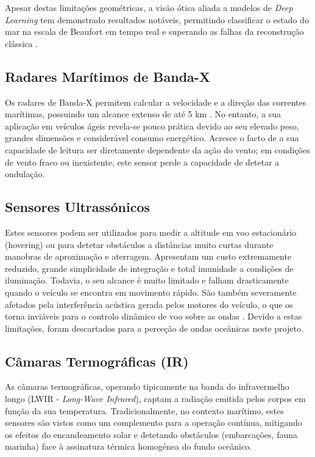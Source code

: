 \documentclass[11pt,a4paper]{article}
\begin{document}
Apesar destas limitações geométricas, a visão ótica aliada a modelos de \emph{Deep Learning} tem demonstrado resultados notáveis, permitindo classificar o estado do mar na escala de Beaufort em tempo real e superando as falhas da reconstrução clássica \parencite{11320450}.

\subsection{Radares Marítimos de Banda-X}
Os radares de Banda-X permitem calcular a velocidade e a 
direção das correntes marítimas, possuindo um alcance 
extenso de até 5 km \parencite{rs9121261}. No entanto, 
a sua aplicação em veículos ágeis revela-se pouco prática 
devido ao seu elevado peso, grandes dimensões e considerável 
consumo energético. Acresce o facto de a sua capacidade de 
leitura ser diretamente dependente da ação do vento; 
em condições de vento fraco ou inexistente, este sensor 
perde a capacidade de detetar a ondulação.

\subsection{Sensores Ultrassónicos}
Estes sensores podem ser utilizados para medir a altitude 
em voo estacionário (hovering) ou para detetar obstáculos a 
distâncias muito curtas durante manobras de aproximação e 
aterragem. Apresentam um custo extremamente reduzido, grande 
simplicidade de integração e total imunidade a condições de 
iluminação. Todavia, o seu alcance é muito limitado e falham 
drasticamente quando o veículo se encontra em movimento rápido. São também severamente afetados pela interferência acústica gerada pelos motores do veículo, o que os torna inviáveis para o controlo dinâmico de voo sobre as ondas \parencite{9046805}. Devido a estas limitações, foram descartados para a perceção de ondas oceânicas neste projeto.

\subsection{Câmaras Termográficas (IR)}
As câmaras termográficas, operando tipicamente na banda do infravermelho longo (LWIR - \textit{Long-Wave Infrared}), captam a radiação emitida pelos corpos em função da sua temperatura. Tradicionalmente, no contexto marítimo, estes sensores são vistos como um complemento para a operação contínua, mitigando os efeitos do encandeamento solar e detetando obstáculos (embarcações, fauna marinha) face à assinatura térmica homogénea do fundo oceânico.
\end{document}
